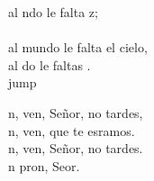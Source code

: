 \begin{cancion}
	al ndo le falta z;\\
	\jump\\
al mundo le falta el cielo,\\
	al do le faltas . \\jump\\
	\begin{chorus}%
	n, ven, Señor, no tardes,\\
	n, ven, que te esramos.\\
	n, ven, Señor, no tardes.\\
	n pron, Seor.\\
	\end{chorus}%
	\jump\\
\end{cancion}%
